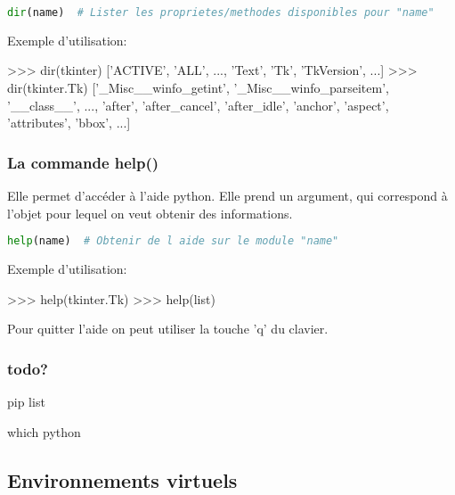 \begin{lstlisting}[language=Python]
dir(name)  # Lister les proprietes/methodes disponibles pour "name"
\end{lstlisting}

Exemple d'utilisation:

\begin{terminal}
>>> dir(tkinter)
['ACTIVE', 'ALL', ...,  'Text', 'Tk', 'TkVersion', ...]
>>> dir(tkinter.Tk)
['_Misc__winfo_getint', '_Misc__winfo_parseitem', '__class__', ..., 'after', 'after_cancel', 'after_idle', 'anchor', 'aspect', 'attributes', 'bbox', ...]
\end{terminal}

\subsubsection{La commande help()}

Elle permet d'accéder à l'aide python. Elle prend un argument, qui correspond à l'objet pour lequel on veut obtenir des informations.
\begin{lstlisting}[language=Python]
help(name)  # Obtenir de l aide sur le module "name"
\end{lstlisting}

Exemple d'utilisation:

\begin{terminal}
>>> help(tkinter.Tk)
>>> help(list)
\end{terminal}

Pour quitter l'aide on peut utiliser la touche 'q' du clavier.

\subsubsection{todo?}

pip list

which python

\subsection{Environnements virtuels}

